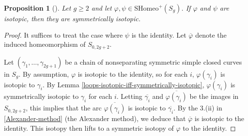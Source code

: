 \documentclass[reqno]{amsart}
\newtheorem{proposition}[theorem]{Proposition}
\theoremstyle{definition}
\theoremstyle{remark}
\newcommand{\SHomeo}{{\mathrm{SHomeo}}}
\begin{document}
   \begin{proposition}[]\label{isotopic-iff-symmetrically-isotopic}
       Let $g \ge 2$ and let $\varphi , \psi \in 
       \SHomeo^{+} (S_g)$. If $\varphi $ and $\psi$ are
       isotopic, then they are symmetrically isotopic.
   \end{proposition}

   \begin{proof}
       It suffices to treat the case where
       $\psi $ is the identity. Let
       $\overline{\varphi }$ denote the induced
       homeomorphism
       of $S_{0, 2g+2}$.
       
       Let $\left( \gamma_1, \ldots, \gamma_{2g+1} \right) $ 
       be a chain of nonseparating symmetric
       simple closed curves in $S_g$. By assumption,
       $\varphi $ is isotopic to the identity, so for
       each $i$, $\varphi \left( \gamma_i \right) $ is
       isotopic to $\gamma_i$. By Lemma
       \ref{loops-isotopic-iff-symmetrically-isotopic},
       $\varphi  \left( \gamma_i \right) $ is symmetrically
       isotopic to $\gamma_i$ for each $i$.
       Letting $\overline{\gamma_i}$ and $
       \overline{\varphi \left( \gamma_i \right) }$ be
       the images in $S_{0,2g+2}$, this implies that
       the arc $\overline{\varphi \left( \gamma_i \right) }$ is
       isotopic to $\overline{\gamma_i}$. By the
       3.(ii) in \ref{Alexander-method}
       (the Alexander method), we deduce that
       $\overline{\varphi }$ is isotopic to the identity.
       This isotopy then lifts to a symmetric isotopy
       of $\varphi $ to the identity.
   \end{proof}
\end{document}
